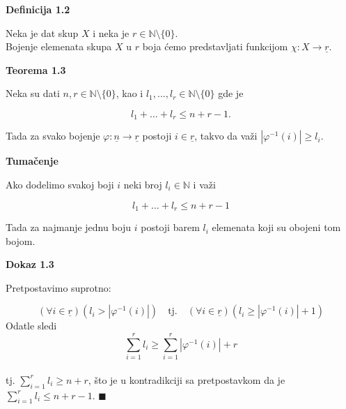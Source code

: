 \documentclass[12pt,a4paper]{article}
\begin{document}
	\begin{mdframed}	
	{\noindent\fontsize{12pt}{12pt}\textbf{Definicija 1.2}}
	\vspace{0.5em}

	\noindent Neka je dat skup $X$ i neka je $r \in \mathbb{N} \setminus \lbrace 0 \rbrace$.\\
	Bojenje elemenata skupa $X$ u $r$ boja ćemo predstavljati funkcijom $\chi : X \rightarrow \underline{r}$.
	\end{mdframed}
	
		\vspace{1em}	
	
	{\noindent\fontsize{12pt}{12pt}\textbf{Teorema 1.3}}
	\vspace{0.5em}

	\noindent Neka su dati $n, r \in \mathbb{N} \setminus \lbrace0\rbrace$, kao i $l_{1},...,l_{r} \in \mathbb{N} \setminus \lbrace0\rbrace$ gde je
	
	\[l_{1}+\dots+l_{r} \leq n+r-1.\]

	\noindent Tada za svako bojenje $\varphi:\underline{n} \rightarrow \underline{r}$ postoji $i \in \underline{r}$, takvo da važi $|\varphi^{-1}(i)| \geq l_{i}.$
	\vspace{1.5em}

	{\noindent\fontsize{12pt}{12pt}\textbf{Tumačenje}}
	\vspace{0.5em}

	\noindent Ako dodelimo svakoj boji $i$
	neki broj $l_{i} \in \mathbb{N}$ i važi
	\vspace{0.5em}

	\[l_{1}+\dots+l_{r} \leq n+r-1\]
	\vspace{0.5em}

	\noindent Tada za najmanje jednu boju $i$ postoji barem $l_{i}$ elemenata koji su obojeni tom bojom.

	\vspace{1.5em}

	{\noindent\fontsize{12pt}{12pt}\textbf{Dokaz 1.3}}
	\vspace{0.5em}

	\noindent Pretpostavimo suprotno:

	\[(\forall i \in \underline{r}) (l_{i} > |\varphi^{-1}(i)|) \quad \text{tj.}\quad (\forall i \in \underline{r})(l_{i} \geq |\varphi^{-1}(i)|+1)\]
	Odatle sledi \[ \sum_{i=1}^{r} l_{i} \geq \sum_{i=1}^{r}|\varphi^{-1}(i)|+r\] 
	\\tj. $ \sum_{i=1}^{r} l_{i} \geq n+r$,
	što je u kontradikciji sa pretpostavkom da je $\sum_{i=1}^{r} l_{i} \leq n+r-1$. $\blacksquare$
\end{document}
